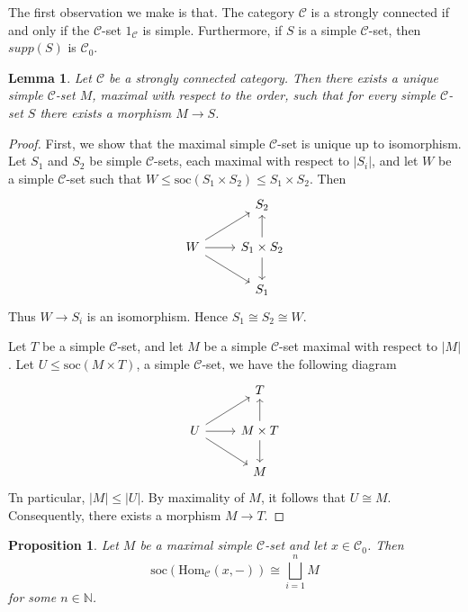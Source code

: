 \documentclass[a4paper]{article}
\newtheorem{lem}[thm]{Lemma}
\newtheorem{prop}[thm]{Proposition}
\theoremstyle{definition}
\theoremstyle{remark}
\newcommand*{\cat}[1]{\mathcal{#1}}
\begin{document}
The first observation we make is that. The category  $\cat{C}$ is a strongly connected if and only if the $\cat{C}$-set $1_{\cat{C}}$ is simple. Furthermore, if $S$ is a simple $\cat{C}$-set, then $supp(S)$ is $\cat{C}_0$.
\begin{lem}
Let $\cat{C}$ be a strongly connected category. Then there exists a unique simple $\cat{C}$-set $M$, maximal with respect to the order, such that for every simple $\cat{C}$-set $S$ there exists a morphism $M \to S$.
\end{lem}
\begin{proof}
First, we show that the maximal simple $\cat{C}$-set is unique up to isomorphism.  Let $S_1$ and $S_2$ be simple $\mathcal{C}$-sets, each maximal with respect to $|S_i|$, and let $W$ be a simple $\mathcal{C}$-set such that $W \leq \mathrm{soc}(S_1 \times S_2)\leq S_1 \times S_2$. Then
\[
\begin{tikzcd}
& S_2 \\
W \arrow[ru] \arrow[r] \arrow[rd] & S_1 \times S_2 \arrow[u] \arrow[d] \\
& S_1
\end{tikzcd}
\]
Thus $W \to S_i$ is an isomorphism. Hence $S_1 \cong S_2 \cong W$.

Let $T$ be a simple $\mathcal{C}$-set, and let $M$ be a simple $\mathcal{C}$-set maximal with respect to $|M|$. Let $U \leq \mathrm{soc}(M \times T)$, a simple $\mathcal{C}$-set, we have the following diagram
\[
\begin{tikzcd}
& T \\
U \arrow[ru] \arrow[r] \arrow[rd] & M \times T \arrow[u] \arrow[d] \\
& M
\end{tikzcd}
\]
Tn particular, $|M| \leq |U|$. By maximality of $M$, it follows that $U \cong M$. Consequently, there exists a morphism $M \to T$.
    
\end{proof}
\begin{prop} \label{maximal in hom }
Let $M$ be a maximal simple $\cat{C}$-set and let $x \in \cat{C}_0$. Then
\[
\mathrm{soc}(\mathrm{Hom}_{\cat{C}}(x,-)) \cong \bigsqcup_{i=1}^n M
\]
for some $n \in \mathbb{N}$.
\end{prop}
\end{document}
